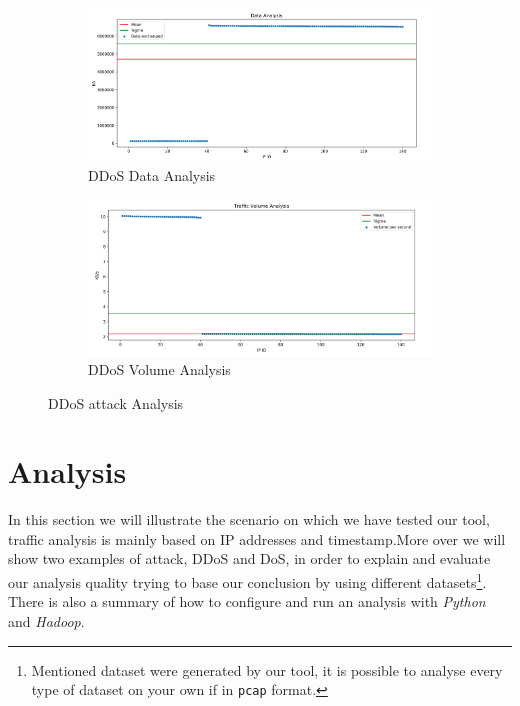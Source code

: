 \begin{figure}[h]
	\begin{subfigure}{0.48\textwidth}
		\includegraphics[width=\textwidth]{imgs/ddos_atk-data_analysis.png}
		\caption{DDoS Data Analysis} 
		\label{fig:ddos_data}
	\end{subfigure}
	\hspace*{\fill} %
	\begin{subfigure}{0.48\textwidth}
		\includegraphics[width=\textwidth]{imgs/ddos_atk-volume_analysis.png}
		\caption{DDoS Volume Analysis} 
		\label{fig:ddos_volume}
	\end{subfigure}
	\caption{DDoS attack Analysis}
	\label{fig:ddos_analysis}
\end{figure}

\section{Analysis}
In this section we will illustrate the scenario on which we have tested our tool, traffic analysis is mainly based on IP addresses and timestamp\cite{ddos_forensics}.More over we will show two examples of attack, DDoS and DoS, in order to explain and evaluate our analysis quality trying to base our conclusion by using different datasets\footnote{Mentioned dataset were generated by our tool, it is possible to analyse every type of dataset on your own if in \texttt{pcap} format.}. There is also a summary of how to configure and run an analysis with \textit{Python} and \textit{Hadoop}.


